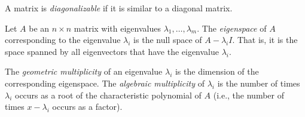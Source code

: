 \begin{SaveDefinition}[key=Diagonalizable, title={Diagonalizable}]
	A matrix is
	\emph{diagonalizable} if it is similar to a diagonal matrix.
\end{SaveDefinition}

\begin{SaveDefinition}[key=Eigenspace, title={Eigenspace}]
	Let $A$ be an $n\times n$ matrix with eigenvalues
	$\lambda_{1},\ldots,\lambda_{m}$. The
	\emph{eigenspace} of $A$ corresponding to the eigenvalue $\lambda_{i}$
	is the null space of $A-\lambda_{i} I$. That is, it is the space spanned
	by all eigenvectors that have the eigenvalue $\lambda_{i}$.

	The
	\emph{geometric multiplicity} of an eigenvalue $\lambda_{i}$ is the
	dimension of the corresponding eigenspace. The
	\emph{algebraic multiplicity} of $\lambda_{i}$ is the number of times
	$\lambda_{i}$ occurs as a root of the characteristic polynomial of $A$ (i.e.,
	the number of times $x-\lambda_{i}$ occurs as a factor).
\end{SaveDefinition}


